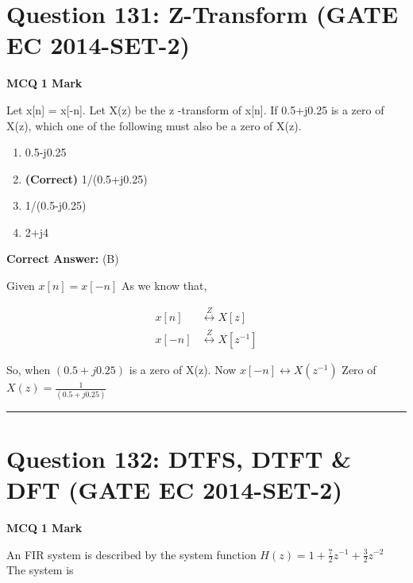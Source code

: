 \documentclass[11pt,a4paper]{article}
\begin{document}
\section*{Question 131: Z-Transform (GATE EC 2014-SET-2)}
\noindent \textbf{\color{primary}MCQ} \hfill \textbf{\color{secondary}1 Mark}


\noindent Let x[n] = x[-n]. Let X(z) be the z -transform of x[n]. If 0.5+j0.25 is a zero of
X(z), which one of the following must also be a zero of X(z).


\begin{enumerate}[label=(\Alph*)]
    \item 0.5-j0.25
    \item \textbf{(Correct)} 1/(0.5+j0.25)
    \item 1/(0.5-j0.25)
    \item 2+j4
\end{enumerate}

\noindent \textbf{Correct Answer:} (B)

\begin{tcolorbox}[solbox, title=Detailed Solution -- Question 131]
Given $x[n]=x[-n]$
 As we know that,

\[
\begin{aligned} x[n] & \stackrel{Z}{\longleftrightarrow} X[z] \\ x[-n] & \stackrel{Z}{\longleftrightarrow} X\left[z^{-1}\right] \end{aligned}
\]

 So, when $(0.5+j 0.25)$ is a zero of X(z).
 Now $x[-n] \longleftrightarrow X\left(z^{-1}\right)$
 Zero of $X(z)=\frac{1}{(0.5+j 0.25)}$
\end{tcolorbox}

\vspace{1.5em}
\hrule
\vspace{1.5em}

\section*{Question 132: DTFS, DTFT \& DFT (GATE EC 2014-SET-2)}
\noindent \textbf{\color{primary}MCQ} \hfill \textbf{\color{secondary}1 Mark}


\noindent An FIR system is described by the system function 
$H(z)=1+\frac{7}{2}z^{-1}+\frac{3}{2}z^{-2}$  
 The system is
\end{document}
